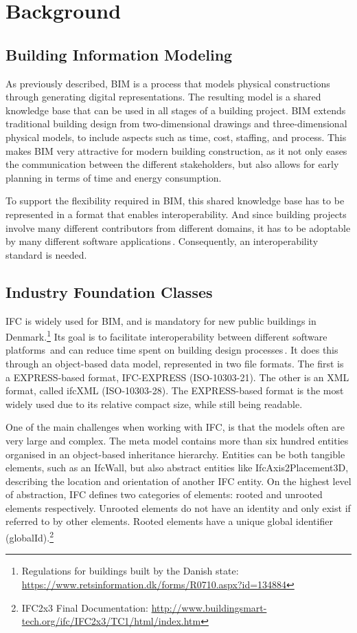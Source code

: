 \section{Background}
\label{sec:background}
\subsection{Building Information Modeling}
\label{sec:building_information_modeling}
As previously described, BIM is a process that models physical constructions through generating digital representations. The resulting model is a shared knowledge base that can be used in all stages of a building project. BIM extends traditional building design from two-dimensional drawings and three-dimensional physical models, to include aspects such as time, cost, staffing, and process. This makes BIM very attractive for modern building construction, as it not only eases the communication between the different stakeholders, but also allows for early planning in terms of time and energy consumption.

To support the flexibility required in BIM, this shared knowledge base has to be represented in a format that enables interoperability. And since building projects involve many different contributors from different domains, it has to be adoptable by many different software applications\,\cite{quteprints37725}. Consequently, an interoperability standard is needed.

\subsection{Industry Foundation Classes}
\label{sec:industry_foundation_classes}
IFC is widely used for BIM, and is mandatory for new public buildings in Denmark.\footnote{Regulations for buildings built by the Danish state: \url{https://www.retsinformation.dk/forms/R0710.aspx?id=134884}} Its goal is to facilitate interoperability between different software platforms\,\cite{steel11} and can reduce time spent on building design processes\,\cite{bazjanac99}. It does this through an object-based data model, represented in two file formats. The first is a EXPRESS-based format, IFC-EXPRESS (ISO-10303-21). The other is an XML format, called ifcXML (ISO-10303-28). The EXPRESS-based format is the most widely used due to its relative compact size, while still being readable.

One of the main challenges when working with IFC, is that the models often are very large and complex. The meta model contains more than six hundred entities organised in an object-based inheritance hierarchy. Entities can be both tangible elements, such as an IfcWall, but also abstract entities like IfcAxis2Placement3D, describing the location and orientation of another IFC entity. On the highest level of abstraction, IFC defines two categories of elements: rooted and unrooted elements respectively. Unrooted elements do not have an identity and only exist if referred to by other elements. Rooted elements have a unique global identifier (globalId).\footnote{IFC2x3 Final Documentation: \url{http://www.buildingsmart-tech.org/ifc/IFC2x3/TC1/html/index.htm}}

